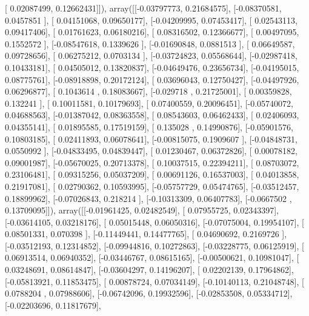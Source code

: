 \documentclass{article}
\begin{document}
       [ 0.02087499,  0.12662431]]), array([[-0.03797773,  0.21684575],
       [-0.08370581,  0.0457851 ],
       [ 0.04151068,  0.09650177],
       [-0.04209995,  0.07453417],
       [ 0.02543113,  0.09417406],
       [ 0.01761623,  0.06180216],
       [ 0.08316502,  0.12366677],
       [ 0.00497095,  0.1552572 ],
       [-0.08547618,  0.1339626 ],
       [-0.01690848,  0.0881513 ],
       [ 0.06649587,  0.09728656],
       [ 0.06275212,  0.0703134 ],
       [-0.03724823,  0.05568644],
       [-0.02987418,  0.10433181],
       [ 0.04505012,  0.13820837],
       [-0.04649476,  0.23656734],
       [-0.04195015,  0.08775761],
       [-0.08918898,  0.20172124],
       [ 0.03696043,  0.12750427],
       [-0.04497926,  0.06296877],
       [ 0.1043614 ,  0.18083667],
       [-0.029718  ,  0.21725001],
       [ 0.00359828,  0.132241  ],
       [ 0.10011581,  0.10179693],
       [ 0.07400559,  0.20096451],
       [-0.05740072,  0.04688563],
       [-0.01387042,  0.08363558],
       [ 0.08543603,  0.06462433],
       [ 0.02406093,  0.04355141],
       [ 0.01895585,  0.17519159],
       [ 0.135028  ,  0.14990876],
       [-0.05901576,  0.10803185],
       [ 0.02411893,  0.06078641],
       [-0.00815075,  0.1909607 ],
       [-0.04848731,  0.0550992 ],
       [-0.04833495,  0.04839447],
       [ 0.01230467,  0.06372826],
       [ 0.00078182,  0.09001987],
       [-0.05670025,  0.20713378],
       [ 0.10037515,  0.22394211],
       [ 0.08703072,  0.23106481],
       [ 0.09315256,  0.05037209],
       [ 0.00691126,  0.16537003],
       [ 0.04013858,  0.21917081],
       [ 0.02790362,  0.10593995],
       [-0.05757729,  0.05474765],
       [-0.03512457,  0.18899962],
       [-0.07026843,  0.218214  ],
       [-0.10313309,  0.06407783],
       [-0.0667502 ,  0.13709095]]), array([[-0.01961425,  0.02482549],
       [ 0.07955725,  0.02343397],
       [-0.03614105,  0.03218176],
       [ 0.05015448,  0.06050316],
       [-0.07075004,  0.19954107],
       [ 0.08501331,  0.070398  ],
       [-0.11449441,  0.14477765],
       [ 0.04690692,  0.2169726 ],
       [-0.03512193,  0.12314852],
       [-0.09944816,  0.10272863],
       [-0.03228775,  0.06125919],
       [ 0.06913514,  0.06940352],
       [-0.03446767,  0.08615165],
       [-0.00500621,  0.10981047],
       [ 0.03248691,  0.08614847],
       [-0.03604297,  0.14196207],
       [ 0.02202139,  0.17964862],
       [-0.05813921,  0.11853475],
       [ 0.00878724,  0.07034149],
       [-0.10140113,  0.21048748],
       [ 0.0788204 ,  0.07988606],
       [-0.06742096,  0.19932596],
       [-0.02853508,  0.05334712],
       [-0.02203696,  0.11817679],
\end{document}

